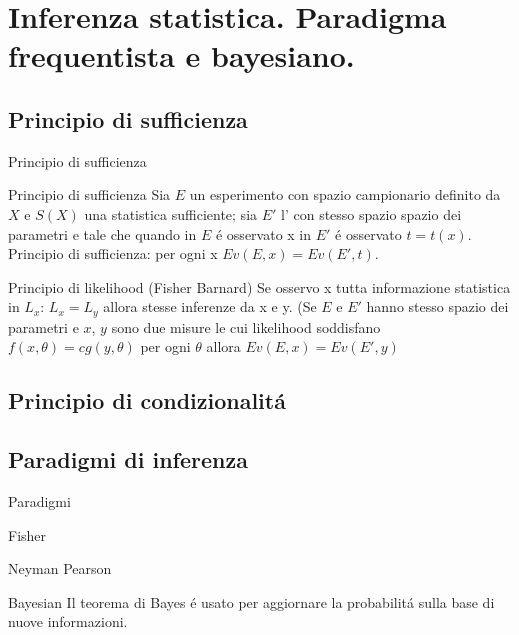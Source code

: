 \section{Inferenza statistica. Paradigma frequentista e bayesiano.}


\subsection{Principio di sufficienza}

\begin{frame}{Principio di sufficienza}
\begin{block}{Principio di sufficienza}
Sia $E$ un esperimento con spazio campionario definito da $X$ e $S(X)$ una statistica sufficiente; sia $E'$ l' con stesso spazio spazio dei parametri e tale che quando in $E$ \'e osservato x in $E'$ \'e osservato $t=t(x)$.
Principio di sufficienza: per ogni x $Ev(E,x)=Ev(E',t)$.
\end{block}
\begin{block}{Principio di likelihood (Fisher Barnard)}
Se osservo x tutta informazione statistica in $L_x$: $L_x=L_y$ allora stesse inferenze da x e y. (Se $E$ e $E'$ hanno stesso spazio dei parametri e $x$, $y$ sono due misure le cui likelihood soddisfano $f(x,\theta)=cg(y,\theta)$ per ogni $\theta$ allora $Ev(E,x)=Ev(E',y)$
\end{block}
\end{frame}

\subsection{Principio di condizionalit\'a}

\subsection{Paradigmi di inferenza}

\begin{frame}{Paradigmi}
\begin{block}{Fisher}

\end{block}
\begin{block}{Neyman Pearson}

\end{block}
\begin{block}{Bayesian}
Il teorema di Bayes \'e usato per aggiornare la probabilit\'a sulla base di nuove informazioni. 
\end{block}
\end{frame}

